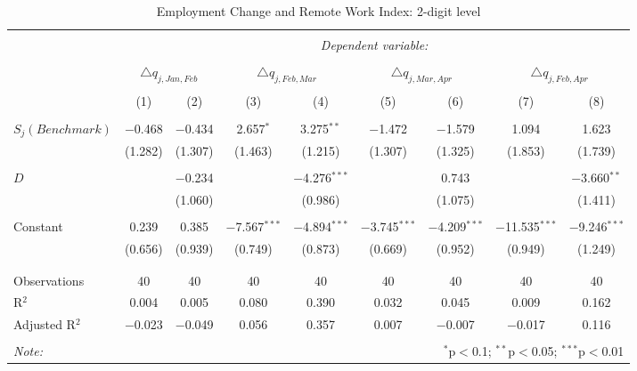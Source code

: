
\begin{table}[!htbp] \centering 
  \caption{Employment Change and Remote Work Index: 2-digit level} 
  \label{tab:regression_dynamics_2digit} 
\footnotesize 
\begin{tabular}{@{\extracolsep{5pt}}lcccccccc} 
\\[-1.8ex]\hline 
\hline \\[-1.8ex] 
 & \multicolumn{8}{c}{\textit{Dependent variable:}} \\ 
\cline{2-9} 
\\[-1.8ex] & \multicolumn{2}{c}{$\triangle q_{j,Jan,Feb}$} & \multicolumn{2}{c}{$\triangle q_{j,Feb,Mar}$} & \multicolumn{2}{c}{$\triangle q_{j,Mar,Apr}$} & \multicolumn{2}{c}{$\triangle q_{j,Feb,Apr}$} \\ 
\\[-1.8ex] & (1) & (2) & (3) & (4) & (5) & (6) & (7) & (8)\\ 
\hline \\[-1.8ex] 
 $S_{j} (Benchmark)$ & $-$0.468 & $-$0.434 & 2.657$^{*}$ & 3.275$^{**}$ & $-$1.472 & $-$1.579 & 1.094 & 1.623 \\ 
  & (1.282) & (1.307) & (1.463) & (1.215) & (1.307) & (1.325) & (1.853) & (1.739) \\ 
  & & & & & & & & \\ 
 $D$ &  & $-$0.234 &  & $-$4.276$^{***}$ &  & 0.743 &  & $-$3.660$^{**}$ \\ 
  &  & (1.060) &  & (0.986) &  & (1.075) &  & (1.411) \\ 
  & & & & & & & & \\ 
 Constant & 0.239 & 0.385 & $-$7.567$^{***}$ & $-$4.894$^{***}$ & $-$3.745$^{***}$ & $-$4.209$^{***}$ & $-$11.535$^{***}$ & $-$9.246$^{***}$ \\ 
  & (0.656) & (0.939) & (0.749) & (0.873) & (0.669) & (0.952) & (0.949) & (1.249) \\ 
  & & & & & & & & \\ 
\hline \\[-1.8ex] 
Observations & 40 & 40 & 40 & 40 & 40 & 40 & 40 & 40 \\ 
R$^{2}$ & 0.004 & 0.005 & 0.080 & 0.390 & 0.032 & 0.045 & 0.009 & 0.162 \\ 
Adjusted R$^{2}$ & $-$0.023 & $-$0.049 & 0.056 & 0.357 & 0.007 & $-$0.007 & $-$0.017 & 0.116 \\ 
\hline 
\hline \\[-1.8ex] 
\textit{Note:}  & \multicolumn{8}{r}{$^{*}$p$<$0.1; $^{**}$p$<$0.05; $^{***}$p$<$0.01} \\ 
\end{tabular} 
\end{table} 
